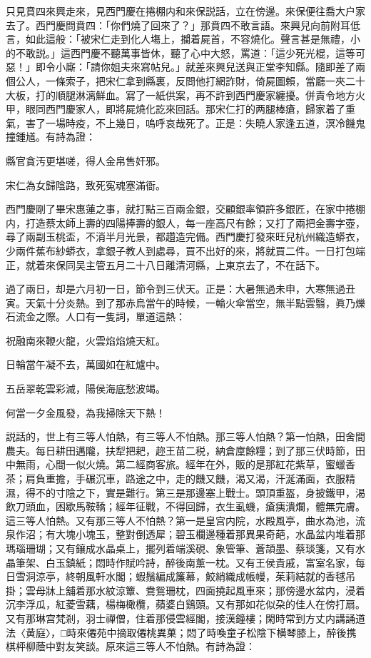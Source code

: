 只見賁四來興走來，見西門慶在捲棚内和來保説話，立在傍邊。來保便往喬大户家去了。西門慶問賁四：「你們燒了回來了？」那賁四不敢言語。來興兒向前附耳低言，如此這般：「被宋仁走到化人塲上，攔着屍首，不容燒化。聲言甚是無禮，小的不敢説。」這西門慶不聽萬事皆休，聽了心中大怒，罵道：「這少死光棍，這等可惡！」即令小廝：「請你姐夫來寫帖兒。」就差來興兒送與正堂李知縣。隨即差了兩個公人，一條索子，把宋仁拿到縣裏，反問他打網詐財，倚屍圖賴，當廳一夾二十大板，打的順腿淋漓鮮血。寫了一紙供案，再不許到西門慶家纏擾。併責令地方火甲，眼同西門慶家人，即將屍燒化訖來回話。那宋仁打的两腿棒瘡，歸家着了重氣，害了一場時疫，不上幾日，嗚呼哀哉死了。正是：失曉人家逢五道，溟冷饑鬼撞鍾馗。有詩為證：

縣官貪汚更堪嗟，得人金帛售奸邪。

宋仁為女歸陰路，致死寃魂塞滿衙。

西門慶剛了畢宋惠蓮之事，就打點三百兩金銀，交顧銀率領許多銀匠，在家中捲棚内，打造蔡太師上壽的四陽捧壽的銀人，每一座高尺有餘；又打了兩把金壽字壺，尋了兩副玉桃盃，不消半月光景，都趲造完備。西門慶打發來旺兒杭州織造蟒衣，少兩件蕉布紗蟒衣，拿銀子教人到處尋，買不出好的來，將就買二件。一日打包端正，就着來保同吴主管五月二十八日離清河縣，上東京去了，不在話下。

過了兩日，却是六月初一日，節令到三伏天。正是：大暑無過未申，大寒無過丑寅。天氣十分炎熱。到了那赤烏當午的時候，一輪火傘當空，無半點雲翳，眞乃爍石流金之際。人口有一隻詞，單道這熱：

祝融南來鞭火龍，火雲焰焰燒天紅。

日輪當午凝不去，萬國如在紅爐中。

五岳翠乾雲彩滅，陽侯海底愁波竭。

何當一夕金風發，為我掃除天下熱！

説話的，世上有三等人怕熱，有三等人不怕熱。那三等人怕熱？第一怕熱，田舍間農夫。每日耕田邁隴，扶犁把耙，趂王苗二税，納倉廩餘糧；到了那三伏時節，田中無雨，心間一似火燒。第二經商客旅。經年在外，販的是那紅花紫草，蜜蠟香茶；肩負重擔，手碾沉車，路途之中，走的饑又饑，渴又渴，汗涎滿面，衣服精濕，得不的寸陰之下，實是難行。第三是那邊塞上戰士。頭頂重盔，身披鐵甲，渴飲刀頭血，困歇馬鞍鞽；經年征戰，不得回歸，衣生虱蟣，瘡痍潰爛，體無完膚。這三等人怕熱。又有那三等人不怕熱？第一是皇宫内院，水殿風亭，曲水為池，流泉作沼；有大塊小塊玉，整對倒透犀；碧玉欄邊種着那異果奇葩，水晶盆内堆着那瑪瑙珊瑚；又有鑲成水晶桌上，擺列着端溪硯、象管筆、蒼頡墨、蔡琰箋，又有水晶筆架、白玉鎮紙；悶時作賦吟詩，醉後南薰一枕。又有王侯貴戚，富室名家，每日雪洞涼亭，終朝風軒水閣；蝦鬚編成簾幕，鮫綃織成帳幔，茱莉結就的香毬吊掛；雲母牀上舖着那水紋涼簟、鴦鴛珊枕，四面撓起風車來；那傍邊水盆内，浸着沉李浮瓜，紅菱雪藕，楊梅橄欖，蘋婆白鷄頭。又有那如花似朶的佳人在傍打扇。又有那琳宫梵剎，羽士禪僧，住着那侵雲經閣，接漢鐘樓；閑時常到方丈内講誦道法〈黄庭〉，□時來僊苑中摘取僊桃異菓；悶了時喚童子松陰下横琴膝上，醉後携棋枰柳蔭中對友笑談。原來這三等人不怕熱。有詩為證：

